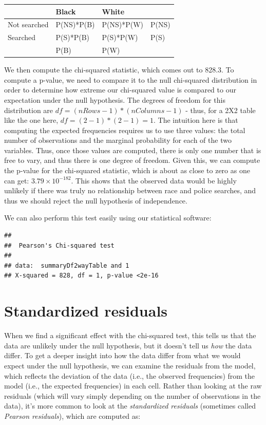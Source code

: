 \documentclass[
  12pt,
]{book}
\begin{document}
\begin{longtable}[]{@{}llll@{}}
\toprule
& Black & White & \\
\midrule
\endhead
Not searched & P(NS)*P(B) & P(NS)*P(W) & P(NS) \\
Searched & P(S)*P(B) & P(S)*P(W) & P(S) \\
& P(B) & P(W) & \\
\bottomrule
\end{longtable}

We then compute the chi-squared statistic, which comes out to 828.3.
To compute a p-value, we need to compare it to the null chi-squared distribution in order to determine how extreme our chi-squared value is compared to our expectation under the null hypothesis. The degrees of freedom for this distribution are \(df = (nRows - 1) * (nColumns - 1)\) - thus, for a 2X2 table like the one here, \(df = (2-1)*(2-1)=1\). The intuition here is that computing the expected frequencies requires us to use three values: the total number of observations and the marginal probability for each of the two variables. Thus, once those values are computed, there is only one number that is free to vary, and thus there is one degree of freedom. Given this, we can compute the p-value for the chi-squared statistic, which is about as close to zero as one can get: \(3.79 \times 10^{-182}\). This shows that the observed data would be highly unlikely if there was truly no relationship between race and police searches, and thus we should reject the null hypothesis of independence.

We can also perform this test easily using our statistical software:

\begin{verbatim}
## 
##  Pearson's Chi-squared test
## 
## data:  summaryDf2wayTable and 1
## X-squared = 828, df = 1, p-value <2e-16
\end{verbatim}

\hypertarget{standardized-residuals}{%
\section{Standardized residuals}\label{standardized-residuals}}

When we find a significant effect with the chi-squared test, this tells us that the data are unlikely under the null hypothesis, but it doesn't tell us \emph{how} the data differ. To get a deeper insight into how the data differ from what we would expect under the null hypothesis, we can examine the residuals from the model, which reflects the deviation of the data (i.e., the observed frequencies) from the model (i.e., the expected frequencies) in each cell. Rather than looking at the raw residuals (which will vary simply depending on the number of observations in the data), it's more common to look at the \emph{standardized residuals} (sometimes called \emph{Pearson residuals}), which are computed as:
\end{document}

